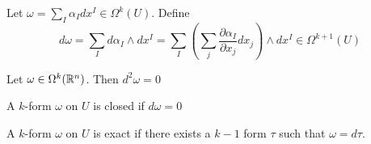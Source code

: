 \documentclass[a4paper]{article}
\begin{document}
\begin{defn} Let $\omega=\sum_I\alpha_Idx^I\in\Omega^k(U)$. Define $$d\omega=\sum_Id\alpha_I\wedge dx^I=\sum_I\left(\sum_j\frac{\partial\alpha_I}{\partial x_j}dx_j\right)\wedge dx^I\in\Omega^{k+1}(U)$$
\end{defn}

\begin{prp} Let $\omega\in\Omega^k(\mathbb{R}^n)$. Then $d^2\omega=0$
\end{prp}

\begin{defn} A $k$-form $\omega$ on $U$ is closed if $d\omega=0$
\end{defn}

\begin{defn} A $k$-form $\omega$ on $U$ is exact if there exists a $k-1$ form $\tau$ such that $\omega=d\tau$. 
\end{defn}
\end{document}
